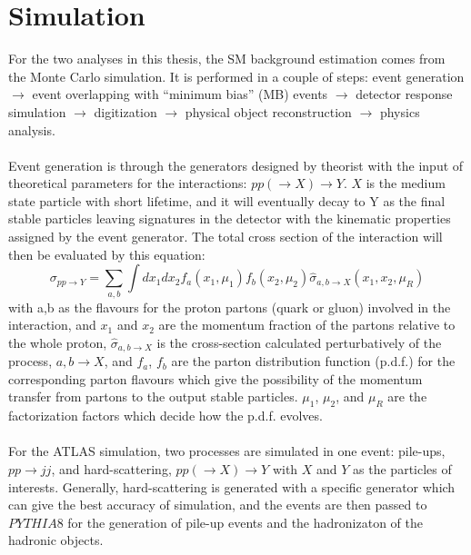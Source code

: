 \section{Simulation}
\label{sec:simulation}
For the two analyses in this thesis, the SM background estimation comes from the Monte Carlo simulation. It is performed in a couple of steps: event generation $\rightarrow$ event overlapping with ``minimum bias'' (MB) events $\rightarrow$  detector response simulation $\rightarrow$ digitization $\rightarrow$ physical object reconstruction $\rightarrow$ physics analysis.
\\
\\Event generation is through the generators designed by theorist with the input of theoretical parameters for the interactions: $pp(\rightarrow X)\rightarrow Y$. $X$ is the medium state particle with short lifetime, and it will eventually decay to Y as the final stable particles leaving signatures in the detector with the kinematic properties assigned by the event generator. The total cross section of the interaction will then be evaluated by this equation\cite{Plehn:2008zs}: 
\begin{equation}
\sigma_{pp\rightarrow Y} = \sum_{a,b} \int dx_{1}dx_{2}f_{a}(x_{1},\mu_{1})f_{b}(x_{2},\mu_{2})\hat{\sigma}_{a,b\rightarrow X}(x_{1},x_{2},\mu_{R})
\end{equation}
with a,b as the flavours for the proton partons (quark or gluon) involved in the interaction, and $x_{1}$ and $x_{2}$ are the momentum fraction of the partons relative to the whole proton, $\hat{\sigma}_{a,b\rightarrow X}$ is the cross-section calculated perturbatively of the process, $a,b\rightarrow X$, and $f_{a}$, $f_{b}$ are the parton distribution function (p.d.f.) for the corresponding parton flavours which give the possibility of the momentum transfer from partons to the output stable particles. $\mu_{1}$, $\mu_{2}$, and $\mu_{R}$ are the factorization factors which decide how the p.d.f. evolves. 
\\
\\For the ATLAS simulation, two processes are simulated in one event: pile-ups, $pp\rightarrow jj$, and hard-scattering, $pp(\rightarrow X)\rightarrow Y$ with $X$ and $Y$ as the particles of interests. Generally, hard-scattering is generated with a specific generator which can give the best accuracy of simulation, and the events are then passed to $PYTHIA8$\cite{Sjostrand:2008vc,Sjostrand:2007gs} for the generation of pile-up events and the hadronizaton of the hadronic objects. 
\\
